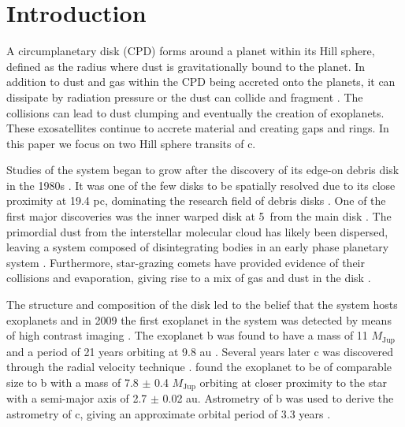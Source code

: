 
\section{Introduction}
%
A circumplanetary disk (CPD) forms around a planet \citep{Taylor_2024} within its Hill sphere, defined as the radius where dust is gravitationally bound to the planet. 
%
In addition to dust and gas within the CPD being accreted onto the planets, it can dissipate by radiation pressure or the dust can collide and fragment \citep{Oberg_2020}.
%
The collisions can lead to dust clumping and eventually the creation of exoplanets.
%
These exosatellites continue to accrete material and creating gaps and rings.
%
In this paper we focus on two Hill sphere transits of \pic c.

Studies of the \pic system began to grow after the discovery of its edge-on debris disk in the 1980s \citep{Smith_1984, van_leeuwen_2007}.
%
It was one of the few disks to be spatially resolved due to its close proximity at 19.4 pc, dominating the research field of debris disks \citep{Artymowicz_1997}.
%
One of the first major discoveries was the inner warped disk at 5\textdegree \ from the main disk \citep{Golimowski_2006}.
%
The primordial dust from the interstellar molecular cloud has likely been dispersed, leaving a system composed of disintegrating bodies in an early phase planetary system \citep[e.g.][]{Backman_1993,Artymowicz_1997,Lagrange_2000,Zuckerman_2001}.
%
Furthermore, star-grazing comets have provided evidence of their collisions and evaporation, giving rise to a mix of gas and dust in the disk  \citep[e.g.][and references therein]{Lagrange_1998,Beust_1990,Lecavelier_Des_Etangs_1995,Beust_1996,Vidal_Madjar_2017}. 

The structure and composition of the disk led to the belief that the system hosts exoplanets and in 2009 the first exoplanet in the system was detected by means of high contrast imaging  \citep{Lagrange_2009}. 
%
%
The exoplanet \pic b was found to have a mass of 11 $M_{\text{Jup}}$ and a period of 21 years orbiting at 9.8 au  \citep[e.g.][and many more]{Lagrange_2010, Chauvin_2012,Wang_2016,Snellen_2018,Kenworthy_2021}. 
%
Several years later \pic c was discovered through the radial velocity technique  \citep{Lagrange_2019,Lagrange_2020,Nowak_2020}. 
%
\cite{Lagrange_2020} found the exoplanet to be of comparable size to \pic b with a mass of 7.8 $\pm$ 0.4 $M_{\text{Jup}}$ orbiting at closer proximity to the star with a semi-major axis of 2.7 $\pm$ 0.02 au. 
%
Astrometry of \pic b was used to derive the astrometry of \pic c, giving an approximate orbital period of 3.3 years \citep{Lacour_2021}. 

